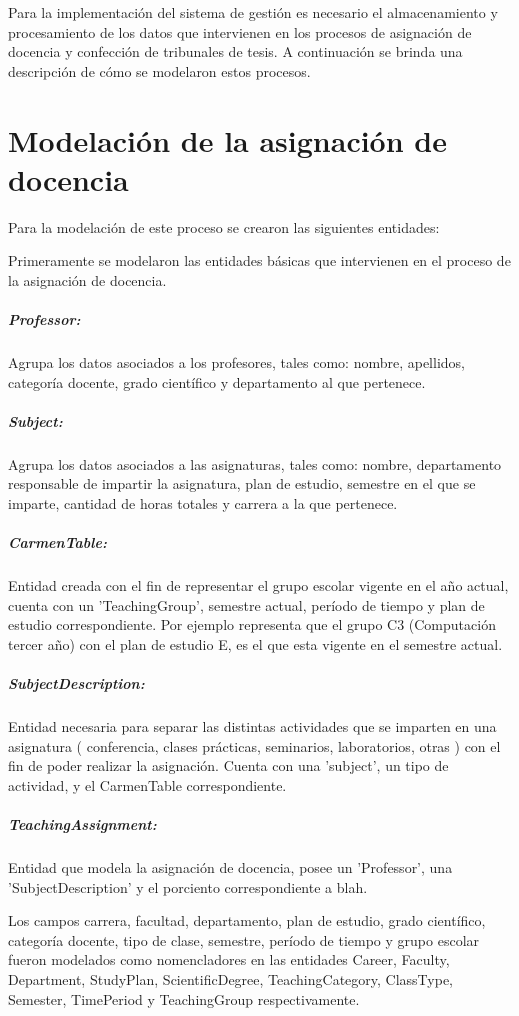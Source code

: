 Para la implementación del sistema de gestión es necesario el almacenamiento
y procesamiento de los datos que intervienen en los procesos de asignación de 
docencia y confección de tribunales de tesis. A continuación se brinda una 
descripción de cómo se modelaron estos procesos.

\section{Modelación de la asignación de docencia}
Para la modelación de este proceso se crearon las 
siguientes entidades:

Primeramente se modelaron las entidades básicas que intervienen 
en el proceso de la asignación de docencia. 




\subparagraph{Professor:}
Agrupa los datos asociados a los profesores, 
tales como: nombre, apellidos, categoría docente, grado 
científico y departamento al que pertenece.

\subparagraph{Subject:}
Agrupa los datos asociados a las asignaturas,
tales como: nombre, departamento responsable de impartir
la asignatura, plan de estudio, semestre en el que se 
imparte, cantidad de horas totales y carrera a la que 
pertenece.

\subparagraph{CarmenTable:}
Entidad creada con el fin de representar
el grupo escolar vigente en el año actual, cuenta con un
'TeachingGroup', semestre actual, período de tiempo y 
plan de estudio correspondiente. Por ejemplo representa 
que el grupo C3 (Computación tercer año) con el plan de 
estudio E, es el que esta vigente en el semestre actual.

\subparagraph{SubjectDescription:}
Entidad necesaria para separar las distintas actividades 
que se imparten en una asignatura ( conferencia, clases 
prácticas, seminarios, laboratorios, otras ) con el fin 
de poder realizar la asignación. Cuenta con una 'subject',
un tipo de actividad, y el CarmenTable correspondiente.


\subparagraph{TeachingAssignment:}
Entidad que modela la asignación de docencia, posee un
'Professor', una 'SubjectDescription' y
el porciento correspondiente a blah.

Los campos carrera, facultad, departamento, plan de 
estudio, grado científico, categoría docente, tipo de 
clase, semestre, período de tiempo y grupo escolar fueron
modelados como nomencladores en las entidades Career,
Faculty, Department, StudyPlan, ScientificDegree, 
TeachingCategory, ClassType, Semester, TimePeriod y 
TeachingGroup respectivamente.


